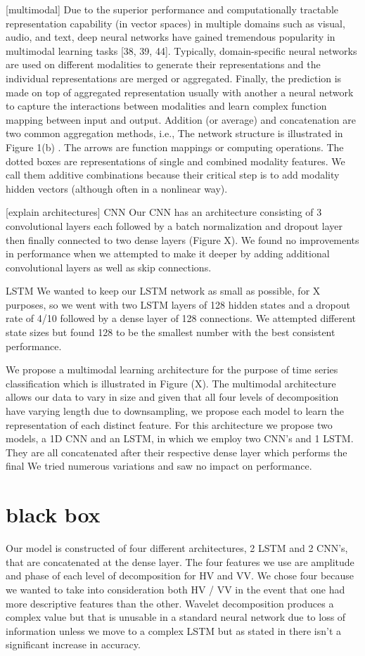 \documentclass{turabian-thesis}
\begin{document}
[multimodal]
Due to the superior performance and computationally tractable representation capability (in vector spaces) in multiple domains such as visual, audio, and text, deep neural networks have gained tremendous popularity in multimodal learning tasks [38, 39, 44]. Typically, domain-specific neural networks are used on different modalities to generate their representations and the individual representations are merged or aggregated. Finally, the prediction is made on top of aggregated representation usually with another a neural network to capture the interactions between modalities and learn complex function mapping between input and output. Addition (or average) and concatenation are two common aggregation methods, i.e.,
The network structure is illustrated in Figure 1(b) . The arrows are function mappings or computing operations. The dotted boxes are representations of single and combined modality features. We call them additive combinations because their critical step is to add modality hidden vectors (although often in a nonlinear way).


[explain architectures]
CNN
Our CNN has an architecture consisting of 3 convolutional layers each followed by a batch normalization and dropout layer then finally connected to two dense layers (Figure X). We found no improvements in performance when we attempted to make it deeper by adding additional convolutional layers as well as skip connections.  

LSTM
We wanted to keep our LSTM network as small as possible, for X purposes, so we went with two LSTM layers of 128 hidden states and a dropout rate of 4/10  followed by a dense layer of 128 connections. We attempted different state sizes but found 128 to be the smallest number with the best consistent performance.



We propose a multimodal learning architecture for the purpose of time series classification which is illustrated in Figure (X). The multimodal architecture allows our data to vary in size and given that all four levels of decomposition have varying length due to downsampling, we propose each model to learn the representation of each distinct feature. For this architecture we propose two models, a 1D CNN and an LSTM, in which we employ two CNN’s and 1 LSTM. They are all concatenated after their respective dense layer which performs the final   We tried numerous variations and saw no impact on performance. 



\section{black box}
Our model is constructed of four different architectures, 2 LSTM and 2 CNN’s, that are concatenated at the dense layer. The four features we use are amplitude and phase of each level of decomposition for HV and VV. We chose four because we wanted to take into consideration both HV / VV in the event that one had more descriptive features than the other. Wavelet decomposition produces a complex value but that is unusable in a standard neural network due to loss of information unless we move to a complex LSTM but as stated in {} there isn’t a significant increase in accuracy. 
\end{document}
